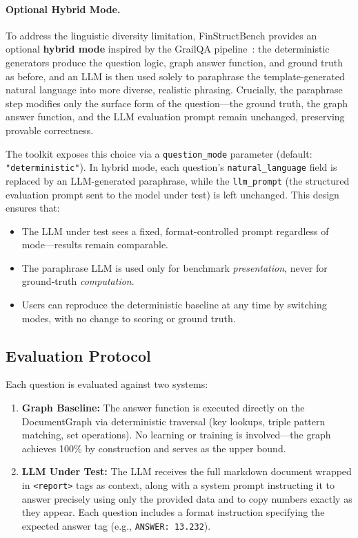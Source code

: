 \documentclass[11pt]{article}
\begin{document}
\paragraph{Optional Hybrid Mode.}
To address the linguistic diversity limitation, FinStructBench provides
an optional \textbf{hybrid mode} inspired by the GrailQA
pipeline~\citep{gu2021grailqa}: the deterministic generators produce the
question logic, graph answer function, and ground truth as before, and an
LLM is then used solely to paraphrase the template-generated natural
language into more diverse, realistic phrasing.  Crucially, the
paraphrase step modifies only the surface form of the question---the
ground truth, the graph answer function, and the LLM evaluation prompt
remain unchanged, preserving provable correctness.

The toolkit exposes this choice via a \texttt{question\_mode} parameter
(default: \texttt{"deterministic"}).  In hybrid mode, each question's
\texttt{natural\_language} field is replaced by an LLM-generated
paraphrase, while the \texttt{llm\_prompt} (the structured evaluation
prompt sent to the model under test) is left unchanged.  This design
ensures that:
\begin{itemize}[leftmargin=2em]
  \item The LLM under test sees a fixed, format-controlled prompt
    regardless of mode---results remain comparable.
  \item The paraphrase LLM is used only for benchmark
    \emph{presentation}, never for ground-truth \emph{computation}.
  \item Users can reproduce the deterministic baseline at any time by
    switching modes, with no change to scoring or ground truth.
\end{itemize}

\subsection{Evaluation Protocol}
\label{sec:eval_protocol}

Each question is evaluated against two systems:

\begin{enumerate}[leftmargin=2em]
  \item \textbf{Graph Baseline:}  The answer function is executed
    directly on the DocumentGraph via deterministic traversal (key
    lookups, triple pattern matching, set operations).  No learning or
    training is involved---the graph achieves 100\% by construction
    and serves as the upper bound.
  \item \textbf{LLM Under Test:}  The LLM receives the full markdown
    document wrapped in \texttt{<report>} tags as context, along with a
    system prompt instructing it to answer precisely using only the
    provided data and to copy numbers exactly as they appear.
    Each question includes a format instruction specifying the expected
    answer tag (e.g., \texttt{ANSWER: 13.232}).
\end{enumerate}
\end{document}
